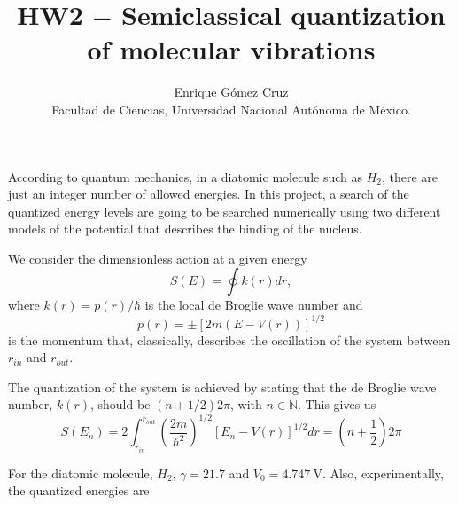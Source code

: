 \documentclass[11pt]{article}
\title{HW2 $-$ Semiclassical quantization of molecular vibrations}
\author{Enrique Gómez Cruz\\Facultad de Ciencias, Universidad Nacional Autónoma de México.}
\date{}
\begin{document}
\maketitle

  
According to quantum mechanics, in a diatomic molecule such as $H_2$, there are just an integer number of allowed energies. In this project, a search of the quantized energy levels are going to be searched numerically using two different models of the potential that describes the binding of the nucleus.

We consider the dimensionless action at a given energy
\begin{equation*}
  S(E) = \oint k(r) dr,
\end{equation*}
where $k(r) = p(r)/\hbar$ is the local de Broglie wave number and 
\begin{equation*}
 p(r) = \pm[2m(E-V(r))]^{1/2}
\end{equation*}
is the momentum that, classically, describes the oscillation of the system between $r_{in}$ and $r_{out}$.

The quantization of the system is achieved by stating that the de Broglie wave number, $k(r)$, should be $(n+1/2)2 \pi$, with $n\in\mathds{N}$. This gives us
\begin{equation}
  S(E_n) = 2\int_{r_{in}}^{r_{out}}\left(\frac{2m}{\hbar^2}\right)^{1/2} \left[E_n-V(r)\right]^{1/2} dr = \left(n+\frac{1}{2}\right) 2\pi
\label{eqn:quantization}
\end{equation}

For the diatomic molecule, $H_2$, $\gamma = 21.7$ and $V_0 = \SI{4.747}{\volt}$. Also, experimentally, the quantized energies are
\end{document}
